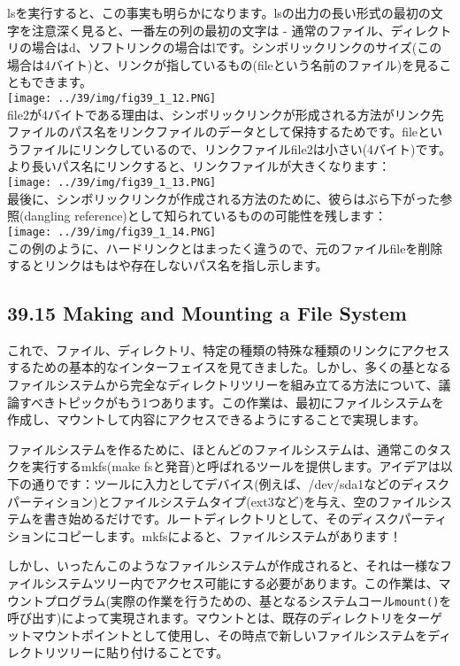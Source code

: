 lsを実行すると、この事実も明らかになります。lsの出力の長い形式の最初の文字を注意深く見ると、一番左の列の最初の文字は
-
通常のファイル、ディレクトリの場合はd、ソフトリンクの場合はlです。シンボリックリンクのサイズ(この場合は4バイト)と、リンクが指しているもの(fileという名前のファイル)を見ることもできます。\\
\texttt{[image: ../39/img/fig39\_1\_12.PNG]}\\
file2が4バイトである理由は、シンボリックリンクが形成される方法がリンク先ファイルのパス名をリンクファイルのデータとして保持するためです。fileというファイルにリンクしているので、リンクファイルfile2は小さい(4バイト)です。より長いパス名にリンクすると、リンクファイルが大きくなります：\\
\texttt{[image: ../39/img/fig39\_1\_13.PNG]}\\
最後に、シンボリックリンクが作成される方法のために、彼らはぶら下がった参照(dangling
reference)として知られているものの可能性を残します：\\
\texttt{[image: ../39/img/fig39\_1\_14.PNG]}\\
この例のように、ハードリンクとはまったく違うので、元のファイルfileを削除するとリンクはもはや存在しないパス名を指し示します。

\hypertarget{making-and-mounting-a-file-system}{%
\subsection*{39.15 Making and Mounting a File
System}\label{making-and-mounting-a-file-system}}

これで、ファイル、ディレクトリ、特定の種類の特殊な種類のリンクにアクセスするための基本的なインターフェイスを見てきました。しかし、多くの基となるファイルシステムから完全なディレクトリツリーを組み立てる方法について、議論すべきトピックがもう1つあります。この作業は、最初にファイルシステムを作成し、マウントして内容にアクセスできるようにすることで実現します。

ファイルシステムを作るために、ほとんどのファイルシステムは、通常このタスクを実行するmkfs(make
fsと発音)と呼ばれるツールを提供します。アイデアは以下の通りです：ツールに入力としてデバイス(例えば、/dev/sda1などのディスクパーティション)とファイルシステムタイプ(ext3など)を与え、空のファイルシステムを書き始めるだけです。ルートディレクトリとして、そのディスクパーティションにコピーします。mkfsによると、ファイルシステムがあります！

しかし、いったんこのようなファイルシステムが作成されると、それは一様なファイルシステムツリー内でアクセス可能にする必要があります。この作業は、マウントプログラム(実際の作業を行うための、基となるシステムコール\texttt{mount()}を呼び出す)によって実現されます。マウントとは、既存のディレクトリをターゲットマウントポイントとして使用し、その時点で新しいファイルシステムをディレクトリツリーに貼り付けることです。

